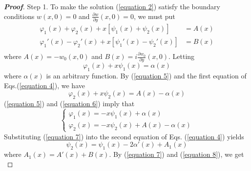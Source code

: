 \documentclass[a4paper]{article}      %
\begin{document}
\begin{proof}[{\bf Proof}]%
\item[\quad Step 1.] To make the solution (\ref{equation 2}) satisfy the boundary conditions $w(x,0)=0$ and $\frac{\partial w}{\partial y}(x,0)=0$, we must put
         \begin{equation}\label{equation 4}                                 %
         \begin{split}
         \varphi_{1}(x)+\varphi_{2}(x)+x[\psi_{1}(x)+\psi_{2}(x)]&=A(x)\\
         \varphi_{1}'(x)-\varphi_{2}'(x)+x[\psi_{1}'(x)-\psi_{2}'(x)]&=B(x)\\
         \end{split}
         \end{equation}
    where $A(x)=-w_{0}(x,0)$ and $B(x)=i\frac{\partial w_{0}}{\partial y}(x,0)$. Letting
         \begin{equation}\label{equation 5}                                 %
           \varphi_{1}(x)+x\psi_{1}(x)=\alpha(x)
         \end{equation}
    where $\alpha(x)$ is an arbitrary function. By (\ref{equation 5}) and the first equation of Eqs.(\ref{equation 4}), we have
         \begin{equation}\label{equation 6}                                 %
          \varphi_{2}(x)+x\psi_{2}(x)=A(x)-\alpha(x)
         \end{equation}
    (\ref{equation 5}) and (\ref{equation 6}) imply that
         \begin{equation}\label{equation 7}                                 %
         \left\{ {\begin{array}{*{20}{l}}
         {\varphi_{1}(x)=-x\psi_{1}(x)+\alpha(x)}\\
         {\varphi_{2}(x)=-x\psi_{2}(x)+A(x)-\alpha(x)}
         \end{array}} \right.
         \end{equation}
    Substituting (\ref{equation 7}) into the second equation of Eqs. (\ref{equation 4}) yields
        \begin{equation}\label{equation 8}                                  %
        \psi_{2}(x)=\psi_{1}(x)-2\alpha'(x)+A_{1}(x)
        \end{equation}
    where $A_{1}(x)=A'(x)+B(x)$. By (\ref{equation 7}) and (\ref{equation 8}), we get
        \begin{equation}\label{equation 9}                                  %

\end{equation}
\end{proof}
\end{document}
